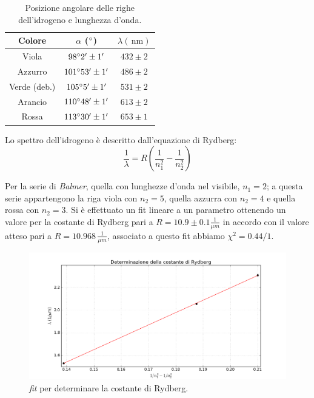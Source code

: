 \documentclass[10pt,a4paper]{article}
\begin{document}
\begin{table}[!htb]
\centering
\begin{tabular}{|c|c|c|}
\hline
Colore & $\alpha$ ($\degree$) & $\lambda (\,\mbox{nm})$\\
\hline 
Viola & $98 \degree 2' \pm 1'$ & $432 \pm 2$ \\ 
\hline 
Azzurro & $101 \degree 53' \pm 1'$ & $486 \pm 2 $ \\ 
\hline 
Verde (deb.)& $105 \degree 5' \pm 1'$ & $531 \pm 2$ \\ 
\hline
Arancio & $110 \degree 48' \pm 1'$ & $613 \pm 2 $ \\ 
\hline 
Rossa & $113 \degree 30' \pm 1'$ & $653 \pm 1$ \\ 
\hline 
\end{tabular} 
\caption{Posizione angolare delle righe dell'idrogeno e lunghezza d'onda.}\label{idrogeno}
\end{table}

Lo spettro dell'idrogeno è descritto dall'equazione di Rydberg:
\begin{equation}
\frac{1}{\lambda}= R \left( \frac{1}{n_{1}^2}-\frac{1}{n_{2}^2} \right)
\end{equation}

Per la serie di \emph{Balmer}, quella con lunghezze d'onda nel visibile, $n_1=2$; a questa serie appartengono la riga viola con $n_2=5$, quella azzurra con $n_2=4$ e quella rossa con $n_2=3$. Si è effettuato un fit lineare a un parametro ottenendo un valore per la costante di Rydberg pari a $R = 10.9 \pm 0.1 \frac{1}{\mu m}$ in accordo con il valore atteso pari a $R=10.968\, \frac{1}{\mu m}$, associato a questo fit abbiamo $\chi^2 = 0.44/1$.\\

\begin{figure}[!htb]
  \centering
  \includegraphics[scale=0.6]{ryd.png}
\caption{\emph{fit} per determinare la costante di Rydberg.}
\label{pin}
\end{figure}
\end{document}
